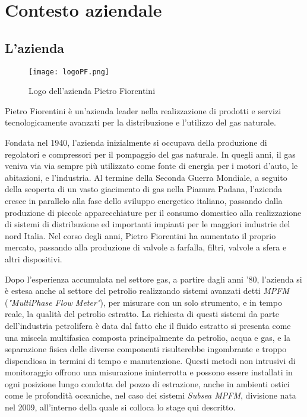 \mainmatter

\chapter{Contesto aziendale}

\section{L'azienda}

\begin{figure}[H]
  \centering
  \texttt{[image: logoPF.png]}
  \caption{Logo dell'azienda Pietro Fiorentini}
\end{figure}
Pietro Fiorentini è un'azienda leader nella realizzazione di prodotti e servizi tecnologicamente avanzati per la distribuzione e l'utilizzo del gas naturale. 

Fondata nel 1940, l'azienda inizialmente si occupava della produzione di regolatori e compressori per il pompaggio del gas naturale. In quegli anni, il gas veniva via via sempre più utilizzato come fonte di energia per i motori d'auto, le abitazioni, e l'industria.
Al termine della Seconda Guerra Mondiale, a seguito della scoperta di un vasto giacimento di gas nella Pianura Padana, l'azienda cresce in parallelo alla fase dello sviluppo energetico italiano, passando dalla produzione di piccole apparecchiature per il consumo domestico alla realizzazione di sistemi di distribuzione ed importanti impianti per le maggiori industrie del nord Italia. Nel corso degli anni, Pietro Fiorentini ha aumentato il proprio mercato, passando alla produzione di valvole a farfalla, filtri, valvole a sfera e altri dispositivi.

Dopo l'esperienza accumulata nel settore gas, a partire dagli anni '80, l'azienda si è estesa anche al settore del petrolio realizzando sistemi avanzati detti \textit{MPFM} (\textit{"MultiPhase Flow Meter"}), per misurare con un solo strumento, e in tempo reale, la qualità del petrolio estratto. La richiesta di questi sistemi da parte dell'industria petrolifera è data dal fatto che il fluido estratto si presenta come una miscela multifasica composta principalmente da petrolio, acqua e gas, e la separazione fisica delle diverse componenti risulterebbe ingombrante e troppo dispendiosa in termini di tempo e manutenzione. Questi metodi non intrusivi di monitoraggio offrono una misurazione ininterrotta e possono essere installati in ogni posizione lungo condotta del pozzo di estrazione, anche in ambienti ostici come le profondità oceaniche, nel caso dei sistemi \textit{Subsea MPFM}, divisione nata nel 2009, all'interno della quale si colloca lo stage qui descritto.

